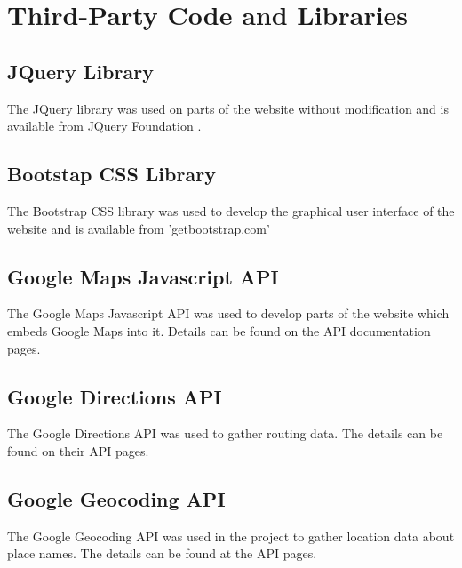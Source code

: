 \chapter{Third-Party Code and Libraries} 

\section{JQuery Library}
The JQuery library was used on parts of the website without modification and is available from JQuery Foundation \cite{jquery_library}.

\section{Bootstap CSS Library}
The Bootstrap CSS library was used to develop the graphical user interface of the website and is available from 'getbootstrap.com' \cite{bootstrap_css}\cite{bootstrap_dashboard}\cite{bootstrap_signin}\cite{bootstrap_jumbotron}

\section{Google Maps Javascript API}
The Google Maps Javascript API was used to develop parts of the website which embeds Google Maps into it. Details can be found on the API documentation pages\cite{google_maps_javascript_api}.

\section{Google Directions API}
The Google Directions API was used to gather routing data. The details can be found on their API pages\cite{google_directions_api}.

\section{Google Geocoding API}
The Google Geocoding API was used in the project to gather location data about place names. The details can be found at the API pages\cite{google_geocoding_api}.
